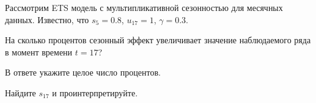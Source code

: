 
\begin{question}
Рассмотрим ETS модель с мультипликативной сезонностью для месячных данных.
Известно, что \(s_{5} = 0.8\), \(u_{17} = 1\), \(\gamma = 0.3\).

На сколько процентов сезонный эффект увеличивает значение наблюдаемого ряда в момент времени \(t=17\)?

В ответе укажите целое число процентов.
\end{question}

\begin{solution}
Найдите \(s_{17}\) и проинтерпретируйте.
\end{solution}

